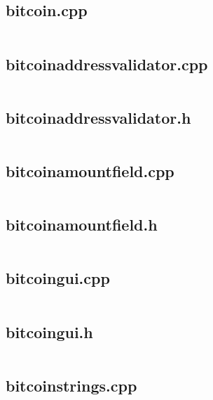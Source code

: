\documentclass{article}
\begin{document}
\subsection{bitcoin.cpp}
\inputminted{cpp}{/home/dufferzafar/dev/@clones/bitcoin/src/qt/bitcoin.cpp}
\newpage

\subsection{bitcoinaddressvalidator.cpp}
\inputminted{cpp}{/home/dufferzafar/dev/@clones/bitcoin/src/qt/bitcoinaddressvalidator.cpp}
\newpage

\subsection{bitcoinaddressvalidator.h}
\inputminted{cpp}{/home/dufferzafar/dev/@clones/bitcoin/src/qt/bitcoinaddressvalidator.h}
\newpage

\subsection{bitcoinamountfield.cpp}
\inputminted{cpp}{/home/dufferzafar/dev/@clones/bitcoin/src/qt/bitcoinamountfield.cpp}
\newpage

\subsection{bitcoinamountfield.h}
\inputminted{cpp}{/home/dufferzafar/dev/@clones/bitcoin/src/qt/bitcoinamountfield.h}
\newpage

\subsection{bitcoingui.cpp}
\inputminted{cpp}{/home/dufferzafar/dev/@clones/bitcoin/src/qt/bitcoingui.cpp}
\newpage

\subsection{bitcoingui.h}
\inputminted{cpp}{/home/dufferzafar/dev/@clones/bitcoin/src/qt/bitcoingui.h}
\newpage

\subsection{bitcoinstrings.cpp}
\inputminted{cpp}{/home/dufferzafar/dev/@clones/bitcoin/src/qt/bitcoinstrings.cpp}
\newpage
\end{document}
